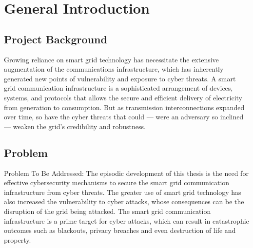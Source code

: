 \chapter*{General Introduction} 
\label{chap:introduction} 
%
%
%
%
%
%
%


\section*{Project Background}
Growing reliance on smart grid technology has necessitate the extensive augmentation of the communications infrastructure, which has inherently generated new points of vulnerability and exposure to cyber threats. A smart grid communication infrastructure is a sophisticated arrangement of devices, systems, and protocols that allows the secure and efficient delivery of electricity from generation to consumption. But as transmission interconnections expanded over time, so have the cyber threats that could — were an adversary so inclined — weaken the grid's credibility and robustness.



\section*{Problem}
Problem To Be Addressed: The episodic development of this thesis is the need for effective cybersecurity mechanisms to secure the smart grid communication infrastructure from cyber threats. The greater use of smart grid technology has also increased the vulnerability to cyber attacks, whose consequences can be the disruption of the grid being attacked. The smart grid communication infrastructure is a prime target for cyber attacks, which can result in catastrophic outcomes such as blackouts, privacy breaches and even destruction of life and property.




